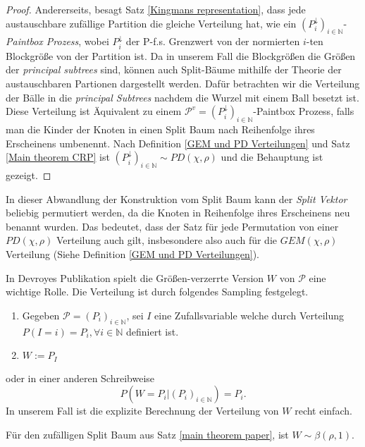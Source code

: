 \begin{proof}
    Andererseits, besagt Satz \ref{Kingmans representation}, dass jede austauschbare zufällige Partition die gleiche Verteilung hat, wie ein $(P^{\downarrow}_i)_{i \in \mathbb{N}}$-\textit{Paintbox Prozess}, wobei $P^{\downarrow}_i$ der P-f.s. Grenzwert von der normierten $i$-ten Blockgröße von der Partition ist. Da in unserem Fall die Blockgrößen die Größen der \textit{principal subtrees} sind, können auch Split-Bäume mithilfe der Theorie der austauschbaren Partionen dargestellt werden. Dafür betrachten wir die Verteilung der Bälle in die \textit{principal Subtrees} nachdem die Wurzel mit einem Ball besetzt ist. Diese Verteilung ist Äquivalent zu einem $\mathcal{P}^{v} = (P_i^{\downarrow})_{i \in \mathbb{N}}$-Paintbox Prozess, falls man die Kinder der Knoten in einen Split Baum nach Reihenfolge ihres Erscheinens umbenennt. Nach Definition \ref{GEM und PD Verteilungen} und Satz \ref{Main theorem CRP} ist $(P^{\downarrow}_i)_{i \in \mathbb{N}} \sim PD(\chi,\rho)$ und die Behauptung ist gezeigt. 

\end{proof}
\begin{Bemerkung}
    \label{Bemerkung PD Verteilungen}
    In dieser Abwandlung der Konstruktion vom Split Baum kann der \textit{Split Vektor} beliebig permutiert werden, da die Knoten in Reihenfolge ihres Erscheinens neu benannt wurden. Das bedeutet, dass der Satz für jede Permutation von einer $PD(\chi,\rho)$ Verteilung auch gilt, insbesondere also auch für die $GEM(\chi,\rho)$ Verteilung (Siehe Definition \ref{GEM und PD Verteilungen}).
\end{Bemerkung}
In Devroyes Publikation \cite{devroye1998universal} spielt die Größen-verzerrte Version $W$ von $\mathcal{P}$ eine wichtige Rolle. Die Verteilung ist durch folgendes Sampling festgelegt.
\begin{enumerate}
    \item Gegeben $\mathcal{P} = (P_i)_{i \in \mathbb{N}}$, sei $I$ eine Zufallsvariable welche durch Verteilung $P(I=i) = P_i, \forall i \in \mathbb{N}$ definiert ist.
    \item $W:= P_I$ 
\end{enumerate}
oder in einer anderen Schreibweise
\[
    P(W = P_i| (P_i)_{i \in \mathbb{N}}) = P_i.
\]
In unserem Fall ist die explizite Berechnung der Verteilung von $W$ recht einfach.
\begin{theorem}
    \label{Verteilung W}
    Für den zufälligen Split Baum aus Satz \ref{main theorem paper}, ist $W \sim \beta(\rho,1)$.
\end{theorem} 
